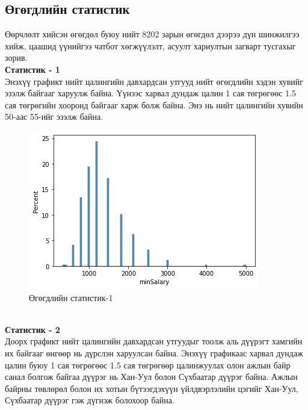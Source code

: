 \subsection{Өгөгдлийн статистик}
Өөрчлөлт хийсэн өгөгдөл буюу нийт 8202 зарын өгөгдөл дээрээ дүн шинжилгээ хийж, цаашид үүнийгээ чатбот хөгжүүлэлт, асуулт хариултын загварт тусгахыг зорив.\\\textbf{Статистик - 1}
\\Энэхүү графикт нийт цалингийн давхардсан утгууд нийт өгөгдлийн хэдэн хувийг эзэлж байгааг харуулж байна. Үүнээс харвал дундаж цалин 1 сая төгрөгөөс 1.5 сая төгрөгийн хооронд байгааг харж болж байна. Энэ нь нийт цалингийн хувийн 50-аас 55-ийг эзэлж байна. 
\begin{figure}[ht]
  \centering
  \includegraphics[width=\textwidth]{graphics/2.png}
  \caption{Өгөгдлийн статистик-1}\label{fig:statistics1}
\end{figure}
\\\indent\textbf{Статистик - 2}
\\Доорх графикт нийт цалингийн давхардсан утгуудыг тоолж аль дүүрэгт хамгийн их байгааг өнгөөр нь дүрслэн харуулсан байна. Энэхүү графикаас харвал дундаж цалин буюу 1 сая төгрөгөөс 1.5 сая төгрөгөөр цалинжуулах олон ажлын байр санал болгож байгаа дүүрэг нь Хан-Уул болон Сүхбаатар дүүрэг байна. Ажлын байрны төвлөрөл болон их хотын бүтээгдэхүүн үйлдвэрлэлийн цэгийг Хан-Уул, Сүхбаатар дүүрэг гэж дүгнэж болохоор байна.  
